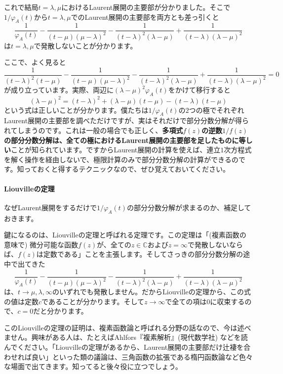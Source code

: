 これで結局$t = \lambda, \mu$におけるLaurent展開の主要部が分かりました。そこで$1/\varphi_A(t)$から$t = \lambda, \mu$でのLaurent展開の主要部を両方とも差っ引くと
\[
\frac{1}{\varphi_A(t)}
- \frac{1}{(t - \mu)(\mu - \lambda)^2} - \frac{1}{(t - \lambda)^2(\lambda - \mu)} + \frac{1}{(t - \lambda)(\lambda - \mu)^2}
\]
は$t = \lambda, \mu$で発散しないことが分かります。

ここで、よく見ると
\[
\frac{1}{(t - \lambda)^2(t - \mu)}
- \frac{1}{(t - \mu)(\mu - \lambda)^2} - \frac{1}{(t - \lambda)^2(\lambda - \mu)} + \frac{1}{(t - \lambda)(\lambda - \mu)^2} = 0
\]
が成り立っています。実際、両辺に$(\lambda - \mu)^2\varphi_A(t)$をかけて移行すると
\[
(\lambda - \mu)^2 = (t - \lambda)^2 + (\lambda - \mu)(t - \mu) - (t - \lambda)(t - \mu)
\]
という式は正しいことが分かります。僕たちは$1/\varphi_A(t)$の$2$つの極でそれぞれLaurent展開の主要部を調べただけですが、実はそれだけで部分分数分解が得られてしまうのです。これは一般の場合でも正しく、\textbf{多項式$f(z)$の逆数$1/f(z)$の部分分数分解は、全ての極におけるLaurent展開の主要部を足したものに等しい}ことが知られています。ですからLaurent展開の計算を使えば、連立$1$次方程式を解く操作を経由しないで、極限計算のみで部分分数分解の計算ができるのです。知っておくと得するテクニックなので、ぜひ覚えておいてください。

\paragraph{Liouvilleの定理}

なぜLaurent展開をするだけで$1/\varphi_A(t)$の部分分数分解が求まるのか、補足しておきます。

鍵になるのは、Liouvilleの定理と呼ばれる定理です。この定理は「(複素函数の意味で) 微分可能な函数$f(z)$が、全ての$z \in \mathbb{C}$および$z = \infty$で発散しないならば、$f(z)$は定数である」ことを主張します。そしてさっきの部分分数分解の途中で出てきた
\[
\frac{1}{\varphi_A(t)}
- \frac{1}{(t - \mu)(\mu - \lambda)^2} - \frac{1}{(t - \lambda)^2(\lambda - \mu)} + \frac{1}{(t - \lambda)(\lambda - \mu)^2}
\]
は、$t \rightarrow \mu, \lambda, \infty$のいずれでも発散しません。だからLiouvilleの定理から、この式の値は定数$c$であることが分かります。そして$z \rightarrow \infty$で全ての項は$0$に収束するので、$c = 0$だと分かります。

このLiouvilleの定理の証明は、複素函数論と呼ばれる分野の話なので、今は述べません。興味がある人は、たとえばAhlfors『複素解析』(現代数学社) などを読んでください。「Liouvilleの定理があるから、Laurent展開の主要部だけ辻褄を合わせれば良い」といった類の議論は、三角函数の拡張である楕円函数論など色々な場面で出てきます。知ってると後々役に立つでしょう。

